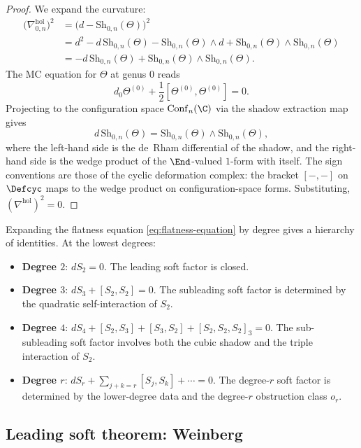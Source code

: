 \begin{proof}
We expand the curvature:
\begin{align*}
\bigl(\nabla^{\mathrm{hol}}_{0,n}\bigr)^2
&= \bigl(d - \mathrm{Sh}_{0,n}(\Theta)\bigr)^2
\\
&= d^2 - d\,\mathrm{Sh}_{0,n}(\Theta) - \mathrm{Sh}_{0,n}(\Theta) \wedge d
 + \mathrm{Sh}_{0,n}(\Theta) \wedge \mathrm{Sh}_{0,n}(\Theta)
\\
&= -d\,\mathrm{Sh}_{0,n}(\Theta)
 + \mathrm{Sh}_{0,n}(\Theta) \wedge \mathrm{Sh}_{0,n}(\Theta).
\end{align*}
The MC equation for $\Theta$ at genus $0$ reads
\[
d_0 \Theta^{(0)} + \frac{1}{2}[\Theta^{(0)}, \Theta^{(0)}] = 0.
\]
Projecting to the configuration space $\mathrm{Conf}_n(\C)$ via the shadow
extraction map gives
\[
d\,\mathrm{Sh}_{0,n}(\Theta)
= \mathrm{Sh}_{0,n}(\Theta) \wedge \mathrm{Sh}_{0,n}(\Theta),
\]
where the left-hand side is the de~Rham differential of the shadow, and the
right-hand side is the wedge product of the $\End$-valued $1$-form with itself.
The sign conventions are those of the cyclic deformation complex: the bracket
$[-,-]$ on $\Defcyc$ maps to the wedge product on configuration-space forms.
Substituting, $(\nabla^{\mathrm{hol}})^2 = 0$.
\end{proof}

\begin{remark}
Expanding the flatness equation \eqref{eq:flatness-equation} by degree gives a
hierarchy of identities. At the lowest degrees:
\begin{itemize}
\item \textbf{Degree $2$}: $dS_2 = 0$. The leading soft factor is closed.
\item \textbf{Degree $3$}: $dS_3 + [S_2, S_2] = 0$. The subleading soft factor is
 determined by the quadratic self-interaction of $S_2$.
\item \textbf{Degree $4$}: $dS_4 + [S_2, S_3] + [S_3, S_2] + [S_2, S_2, S_2]_3 = 0$.
 The sub-subleading soft factor involves both the cubic shadow and the triple interaction
 of $S_2$.
\item \textbf{Degree $r$}: $dS_r + \sum_{j+k=r} [S_j, S_k] + \cdots = 0$. The degree-$r$
 soft factor is determined by the lower-degree data and the degree-$r$ obstruction class
 $o_r$.
\end{itemize}
\end{remark}

\subsection{Leading soft theorem: Weinberg}

